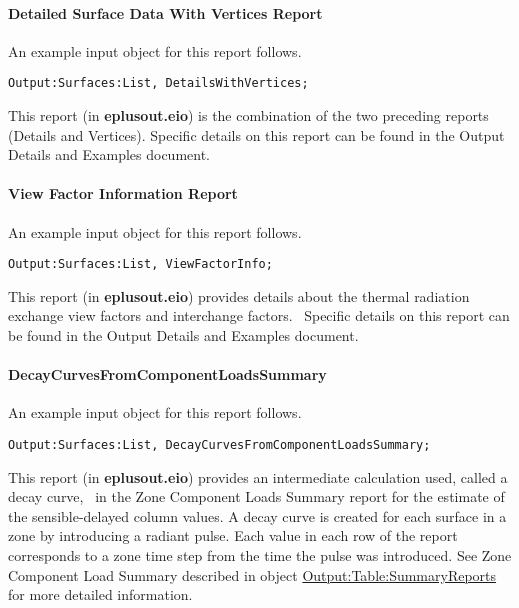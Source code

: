 \paragraph{Detailed Surface Data With Vertices Report}\label{detailed-surface-data-with-vertices-report}

An example input object for this report follows.

\begin{lstlisting}
Output:Surfaces:List, DetailsWithVertices;
\end{lstlisting}

This report (in \textbf{eplusout.eio}) is the combination of the two preceding reports (Details and Vertices). Specific details on this report can be found in the Output Details and Examples document.

\paragraph{View Factor Information Report}\label{view-factor-information-report}

An example input object for this report follows.

\begin{lstlisting}
Output:Surfaces:List, ViewFactorInfo;
\end{lstlisting}

This report (in \textbf{eplusout.eio}) provides details about the thermal radiation exchange view factors and interchange factors.~ Specific details on this report can be found in the Output Details and Examples document.

\paragraph{DecayCurvesFromComponentLoadsSummary}\label{decaycurvesfromcomponentloadssummary}

An example input object for this report follows.

\begin{lstlisting}
Output:Surfaces:List, DecayCurvesFromComponentLoadsSummary;
\end{lstlisting}

This report (in \textbf{eplusout.eio}) provides an intermediate calculation used, called a decay curve,~ in the Zone Component Loads Summary report for the estimate of the sensible-delayed column values. A decay curve is created for each surface in a zone by introducing a radiant pulse. Each value in each row of the report corresponds to a zone time step from the time the pulse was introduced. See Zone Component Load Summary described in object \hyperref[outputtablesummaryreports]{Output:Table:SummaryReports} for more detailed information.

